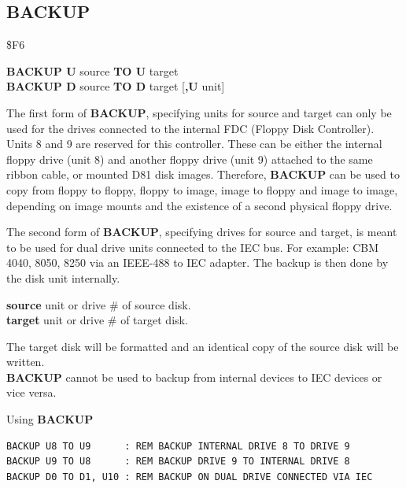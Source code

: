 \subsection{BACKUP}
\begin{description}[leftmargin=2cm,style=nextline]
\item [Token:] \$F6
\item [Format:] {\bf BACKUP U} source {\bf TO U} target \\
                {\bf BACKUP D} source {\bf TO D} target [{\bf,U} unit]
\item [Usage:] The first form of {\bf BACKUP}, specifying
               units for source and target can only be used for the drives
               connected to the internal FDC (Floppy Disk Controller).
               Units 8 and 9 are reserved for this controller.
               These can be either the internal floppy drive (unit 8) and
               another floppy drive (unit 9) attached to the same ribbon cable,
               or mounted D81 disk images. Therefore, {\bf BACKUP} can be used to
               copy from floppy to floppy, floppy to image, image to floppy
               and image to image, depending on image mounts and the existence of
               a second physical floppy drive.

               The second form of {\bf BACKUP}, specifying
               drives for source and target, is meant to be used for
               dual drive units connected to the IEC bus.
   For example: CBM 4040, 8050, 8250 via an IEEE-488 to IEC adapter.
   The backup is then done by the disk unit internally.

   {\bf source} unit or drive \# of source disk. \\
   {\bf target} unit or drive \# of target disk.

\item [Remarks:] The target disk will be formatted and
                 an identical copy of the source disk will be written. \\
                 {\bf BACKUP} cannot be used to backup
                 from internal devices to IEC devices or vice versa.

\item [Examples:] Using {\bf BACKUP}

\begin{tcolorbox}[colback=black,coltext=white]
\verbatimfont{\codefont}
\begin{verbatim}
BACKUP U8 TO U9      : REM BACKUP INTERNAL DRIVE 8 TO DRIVE 9
BACKUP U9 TO U8      : REM BACKUP DRIVE 9 TO INTERNAL DRIVE 8
BACKUP D0 TO D1, U10 : REM BACKUP ON DUAL DRIVE CONNECTED VIA IEC
\end{verbatim}
\end{tcolorbox}
\end{description}

